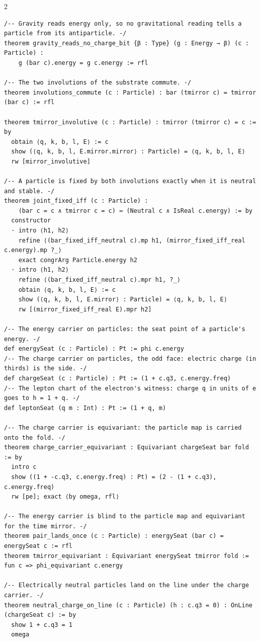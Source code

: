 \documentclass[10pt]{article}
\begin{document}
\begin{multicols}{2}
\begin{Verbatim}[fontsize=\fontsize{6.0}{6.9}\selectfont,breaklines,breakanywhere,breaksymbolleft={}]
/-- Gravity reads energy only, so no gravitational reading tells a particle from its antiparticle. -/
theorem gravity_reads_no_charge_bit {β : Type} (g : Energy → β) (c : Particle) :
    g (bar c).energy = g c.energy := rfl

/-- The two involutions of the substrate commute. -/
theorem involutions_commute (c : Particle) : bar (tmirror c) = tmirror (bar c) := rfl

theorem tmirror_involutive (c : Particle) : tmirror (tmirror c) = c := by
  obtain ⟨q, k, b, l, E⟩ := c
  show (⟨q, k, b, l, E.mirror.mirror⟩ : Particle) = ⟨q, k, b, l, E⟩
  rw [mirror_involutive]

/-- A particle is fixed by both involutions exactly when it is neutral and stable. -/
theorem joint_fixed_iff (c : Particle) :
    (bar c = c ∧ tmirror c = c) ↔ (Neutral c ∧ IsReal c.energy) := by
  constructor
  · intro ⟨h1, h2⟩
    refine ⟨(bar_fixed_iff_neutral c).mp h1, (mirror_fixed_iff_real c.energy).mp ?_⟩
    exact congrArg Particle.energy h2
  · intro ⟨h1, h2⟩
    refine ⟨(bar_fixed_iff_neutral c).mpr h1, ?_⟩
    obtain ⟨q, k, b, l, E⟩ := c
    show (⟨q, k, b, l, E.mirror⟩ : Particle) = ⟨q, k, b, l, E⟩
    rw [(mirror_fixed_iff_real E).mpr h2]

/-- The energy carrier on particles: the seat point of a particle's energy. -/
def energySeat (c : Particle) : Pt := phi c.energy
/-- The charge carrier on particles, the odd face: electric charge (in thirds) is the side. -/
def chargeSeat (c : Particle) : Pt := (1 + c.q3, c.energy.freq)
/-- The lepton chart of the electron's witness: charge q in units of e goes to h = 1 + q. -/
def leptonSeat (q m : Int) : Pt := (1 + q, m)

/-- The charge carrier is equivariant: the particle map is carried onto the fold. -/
theorem charge_carrier_equivariant : Equivariant chargeSeat bar fold := by
  intro c
  show ((1 + -c.q3, c.energy.freq) : Pt) = (2 - (1 + c.q3), c.energy.freq)
  rw [pe]; exact ⟨by omega, rfl⟩

/-- The energy carrier is blind to the particle map and equivariant for the time mirror. -/
theorem pair_lands_once (c : Particle) : energySeat (bar c) = energySeat c := rfl
theorem tmirror_equivariant : Equivariant energySeat tmirror fold := fun c => phi_equivariant c.energy

/-- Electrically neutral particles land on the line under the charge carrier. -/
theorem neutral_charge_on_line (c : Particle) (h : c.q3 = 0) : OnLine (chargeSeat c) := by
  show 1 + c.q3 = 1
  omega


\end{Verbatim}
\end{multicols}
\end{document}
